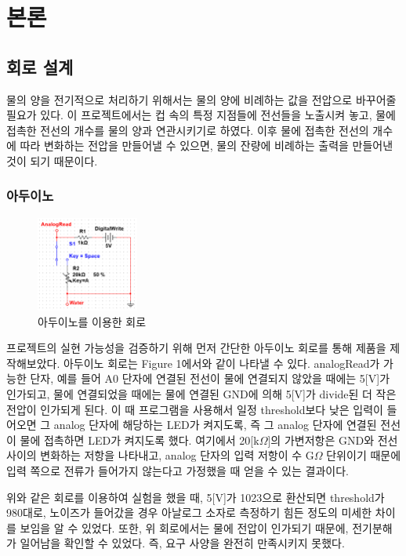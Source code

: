 \documentclass[a4paper,itemph]{oblivoir}
\theoremstyle{definition}
\begin{document}
\section{본론}
\subsection{회로 설계}
물의 양을 전기적으로 처리하기 위해서는 물의 양에 비례하는 값을 전압으로 바꾸어줄 필요가 있다. 이 프로젝트에서는 컵 속의 특정 지점들에 전선들을 노출시켜 놓고, 물에 접촉한 전선의 개수를 물의 양과 연관시키기로 하였다. 이후 물에 접촉한 전선의 개수에 따라 변화하는 전압을 만들어낼 수 있으면, 물의 잔량에 비례하는 출력을 만들어낸 것이 되기 때문이다.
\subsubsection{아두이노}
\begin{figure}[h]
\centering
\includegraphics[width=0.3\textwidth]{arduino.PNG}
\caption{아두이노를 이용한 회로}
\end{figure}
프로젝트의 실현 가능성을 검증하기 위해 먼저 간단한 아두이노 회로를 통해 제품을 제작해보았다. 아두이노 회로는 Figure 1에서와 같이 나타낼 수 있다. analogRead가 가능한 단자, 예를 들어 A0 단자에 연결된 전선이 물에 연결되지 않았을 때에는 5[V]가 인가되고, 물에 연결되었을 때에는 물에 연결된 GND에 의해 5[V]가 divide된 더 작은 전압이 인가되게 된다. 이 때 프로그램을 사용해서 일정 threshold보다 낮은 입력이 들어오면 그 analog 단자에 해당하는 LED가 켜지도록, 즉 그 analog 단자에 연결된 전선이 물에 접촉하면 LED가 켜지도록 했다. 여기에서 20[k$\Omega$]의 가변저항은 GND와 전선 사이의 변화하는 저항을 나타내고, analog 단자의 입력 저항이 수 G$\Omega$ 단위이기 때문에 입력 쪽으로 전류가 들어가지 않는다고 가정했을 때 얻을 수 있는 결과이다.

위와 같은 회로를 이용하여 실험을 했을 때, 5[V]가 1023으로 환산되면 threshold가 980대로, 노이즈가 들어갔을 경우 아날로그 소자로 측정하기 힘든 정도의 미세한 차이를 보임을 알 수 있었다. 또한, 위 회로에서는 물에 전압이  인가되기 때문에, 전기분해가 일어남을 확인할 수 있었다. 즉, 요구 사양을 완전히 만족시키지 못했다.
\end{document}

